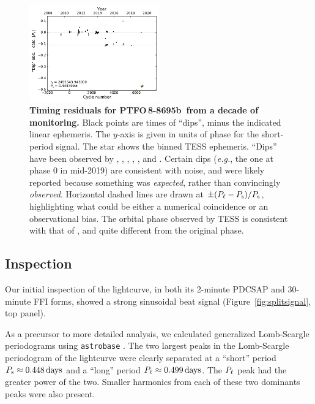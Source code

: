 \documentclass[12pt,twocolumn,tighten]{aastex62}
\newcommand{\ptfob}{PTFO$\,$8-8695b}
\begin{document}
\begin{figure}[t]
	\begin{center}
		\leavevmode
		\includegraphics[width=0.5\textwidth]{f5.pdf}
	\end{center}
	\vspace{-0.7cm}
	\caption{
		{\bf Timing residuals for \ptfob\ from a decade of monitoring.}
		Black points are times of ``dips'', minus the indicated linear
		ephemeris.  The $y$-axis is given in units of phase for the
		short-period signal.  The star shows the binned TESS ephemeris.
		``Dips'' have been observed by \citet{van_eyken_ptf_2012},
		\citet{ciardi_follow-up_2015}, \citet{yu_tests_2015},
		\citet{raetz_yeti_2016}, \citet{onitsuka_multi-color_2017}, and
		\citet{tanimoto_evidence_2020}.  Certain dips ({\it e.g.}, the one
		at phase 0 in mid-2019) are consistent with noise, and were likely
		reported because something was {\it expected}, rather than
		convincingly {\it observed}.  Horizontal dashed lines are drawn at
		$\pm (P_{\rm \ell} - P_{\rm s})/P_{\rm s}$, highlighting what
		could be either a numerical coincidence or an observational bias.
		The orbital phase observed by TESS is consistent with that of
		\citet{tanimoto_evidence_2020}, and quite different from the
		original phase.
		\label{fig:o_minus_c}
	}
\end{figure}

\subsection{Inspection}

Our initial inspection of the lightcurve, in both its 2-minute PDCSAP
and 30-minute FFI forms, showed a strong sinusoidal beat signal
(Figure~\ref{fig:splitsignal}, top panel).

As a precursor to more detailed analysis, we calculated generalized
Lomb-Scargle periodograms using \texttt{astrobase}
\citep{lomb_1976,scargle_studies_1982,vanderplas_periodograms_2015,bhatti_astrobase_2018}.
The two largest peaks in the Lomb-Scargle periodogram of the
lightcurve were clearly separated at a ``short'' period $P_{\rm s}
\approx 0.448\,{\rm days}$ and a ``long'' period $P_{\rm \ell} \approx
0.499\,{\rm days}$.  The $P_{\rm \ell}$ peak had the greater power of
the two.  Smaller harmonics from each of these two dominants peaks
were also present.
\end{document}
